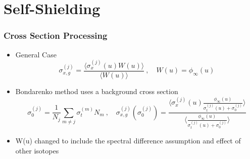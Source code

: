 \documentclass[xcolor=x11names,compress]{beamer}
\renewcommand{\(}{\begin{columns}}
\renewcommand{\)}{\end{columns}}
\newcommand{\<}[1]{\begin{column}{#1}}
\renewcommand{\>}{\end{column}}
\newcommand{\micro}{\ensuremath{\sigma}}
\begin{document}
\section{Self-Shielding}
\begin{frame}[fragile]
  \frametitle{Cross Section Processing}

	\begin{itemize}
	\item General Case
	\begin{equation}
  	\micro_{x,g}^{(j)} = \frac{\langle \micro_x^{(j)}(u) W(u)\rangle}
	{\langle W(u)\rangle} \:, \quad W(u) = \phi_{\infty}(u)
 	 \label{eq:baseBondarenko}
 	\end{equation} 
 	
 	\item Bondarenko method uses a background cross section
 	\begin{equation}
  	\micro_0^{(j)} = \frac{1}{N_j} \sum_{m \ne j} \micro_{t}^{(m)} N_m 
  	\:, \quad \micro_{x,g}^{(j)}(\micro_0^{(j)}) = \frac{\langle
  	 \micro_{x}^{(j)}(u) \frac{\phi_{\infty}(u)} {\micro_{t}^{(j)}(u)
  	 + \micro_0^{(j)}} \rangle}
  	 { \langle \frac{\phi_{\infty}(u)}{\micro_{t}^{(j)}(u) +
  	 \micro_0^{(j)}}\rangle}
  \label{eq:ssfact}
	\end{equation}

	\item W(u) changed to include the  spectral difference assumption and effect of other isotopes
	\end{itemize}
	
\end{frame}
	
\end{document}
